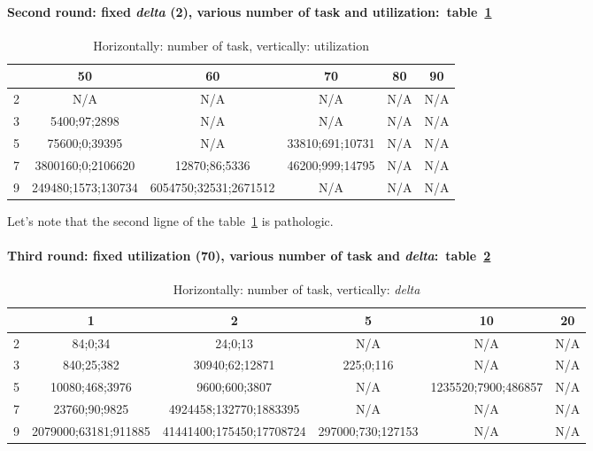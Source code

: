 \documentclass[a4paper,11pt]{article}
\begin{document}
     
    \paragraph{Second round: fixed \textit{delta} (2), various number of task and utilization:~table~\ref{tb:test2}}
    \begin{table}[!h]
    \centering
    \begin{tabular}{|c|c|c|c|c|c|} \hline
       & 50 & 60 & 70 & 80 & 90 \\ \hline
		2&N/A&N/A&N/A&N/A&N/A \\ \hline
		3&5400;97;2898 & N/A & N/A & N/A & N/A \\ \hline
		5 & 75600;0;39395 & N/A & 33810;691;10731 & N/A & N/A \\ \hline
		7 & 3800160;0;2106620 & 12870;86;5336 & 46200;999;14795 & N/A & N/A \\ \hline
		9 & 249480;1573;130734&6054750;32531;2671512 & N/A & N/A & N/A \\ \hline
   \end{tabular}
    \caption{Horizontally: number of task, vertically: utilization}
	\label{tb:test2}
    \end{table}
	
	Let's note that the second ligne of the table~\ref{tb:test2} is pathologic.
     
	\paragraph{Third round: fixed utilization (70), various number of task and \textit{delta}:~table~\ref{tb:test3}}
    \begin{table}[!h]
    \centering
    \begin{tabular}{|c|c|c|c|c|c|} \hline
		& 1 & 2 & 5 & 10 & 20 \\ \hline
		2 & 84;0;34 & 24;0;13 & N/A & N/A & N/A \\ \hline
		3 & 840;25;382 & 30940;62;12871 & 225;0;116 & N/A & N/A \\ \hline
		5 & 10080;468;3976 & 9600;600;3807 & N/A & 1235520;7900;486857 & N/A \\ \hline
		7 & 23760;90;9825 &4924458;132770;1883395 & N/A & N/A & N/A \\ \hline
		9 & 2079000;63181;911885 & 41441400;175450;17708724 & 297000;730;127153 & N/A & N/A \\ \hline
   \end{tabular}
   \caption{Horizontally: number of task, vertically: \textit{delta}}
	\label{tb:test3}
    \end{table}
     
\end{document}
